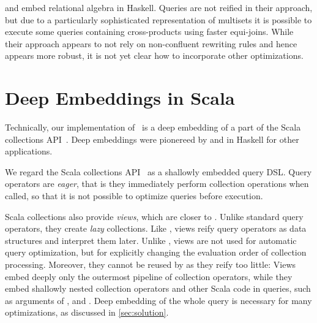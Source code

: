 


\citet{Henglein2010optimizing} and \citet{Henglein2010generic} embed relational algebra in
Haskell. Queries are not reified in their approach, but due to a particularly
sophisticated representation of multisets it is possible to execute some queries
containing cross-products using faster equi-joins. While their approach appears
to not rely on non-confluent rewriting rules and hence appears more robust, it
is not yet clear how to incorporate other optimizations.

\section{Deep Embeddings in Scala}
\label{sec:rwdsl}
Technically, our implementation of \LoS\ is a deep embedding of a part of the Scala collections API~\citep{odersky2009fighting}.
Deep embeddings were pionereed by \citet{Leijen99DSEC} and \citet{elliott03compiling} in Haskell for other applications.

We regard the Scala collections API~\citep{odersky2009fighting} as a shallowly
embedded query DSL\@. Query operators are \emph{eager}, that is they immediately
perform collection operations when called, so that it is not possible to
optimize queries before execution.

Scala collections also provide \emph{views}, which are closer to {\LoS}. Unlike
standard query operators, they create \emph{lazy} collections. Like {\LoS},
views reify query operators as data structures and interpret them later. Unlike
{\LoS}, views are not used for automatic query optimization, but for explicitly
changing the evaluation order of collection processing.
%
Moreover, they cannot be reused by {\LoS} as they reify too little: Views embed
deeply only the outermost pipeline of collection operators, while they embed
shallowly nested collection operators and other Scala code in queries, such as
arguments of ,  and .
%
Deep embedding of the whole query is necessary for many optimizations, as
discussed in \cref{sec:solution}.

